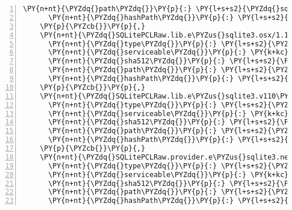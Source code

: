 \begin{Verbatim}[commandchars=\\\{\},numbers=left,firstnumber=1,stepnumber=1,numberblanklines=0]
      \PY{n+nt}{\PYZdq{}path\PYZdq{}}\PY{p}{:} \PY{l+s+s2}{\PYZdq{}sqlitepclraw.lib.e\PYZus{}sqlite3.linux/1.1.10\PYZdq{}}\PY{p}{,}
      \PY{n+nt}{\PYZdq{}hashPath\PYZdq{}}\PY{p}{:} \PY{l+s+s2}{\PYZdq{}sqlitepclraw.lib.e\PYZus{}sqlite3.linux.1.1.10.nupkg.sha512\PYZdq{}}
    \PY{p}{\PYZcb{}}\PY{p}{,}
    \PY{n+nt}{\PYZdq{}SQLitePCLRaw.lib.e\PYZus{}sqlite3.osx/1.1.10\PYZdq{}}\PY{p}{:} \PY{p}{\PYZob{}}
      \PY{n+nt}{\PYZdq{}type\PYZdq{}}\PY{p}{:} \PY{l+s+s2}{\PYZdq{}package\PYZdq{}}\PY{p}{,}
      \PY{n+nt}{\PYZdq{}serviceable\PYZdq{}}\PY{p}{:} \PY{k+kc}{true}\PY{p}{,}
      \PY{n+nt}{\PYZdq{}sha512\PYZdq{}}\PY{p}{:} \PY{l+s+s2}{\PYZdq{}sha512\PYZhy{}9QBqbklaYeBbM6UhGWdXiLxqjgpFWz0aVDJTocUR010Y232rmvLjci2bJRN8wknUPvBd9Uruwdtp+IRn2cV24g==\PYZdq{}}\PY{p}{,}
      \PY{n+nt}{\PYZdq{}path\PYZdq{}}\PY{p}{:} \PY{l+s+s2}{\PYZdq{}sqlitepclraw.lib.e\PYZus{}sqlite3.osx/1.1.10\PYZdq{}}\PY{p}{,}
      \PY{n+nt}{\PYZdq{}hashPath\PYZdq{}}\PY{p}{:} \PY{l+s+s2}{\PYZdq{}sqlitepclraw.lib.e\PYZus{}sqlite3.osx.1.1.10.nupkg.sha512\PYZdq{}}
    \PY{p}{\PYZcb{}}\PY{p}{,}
    \PY{n+nt}{\PYZdq{}SQLitePCLRaw.lib.e\PYZus{}sqlite3.v110\PYZus{}xp/1.1.10\PYZdq{}}\PY{p}{:} \PY{p}{\PYZob{}}
      \PY{n+nt}{\PYZdq{}type\PYZdq{}}\PY{p}{:} \PY{l+s+s2}{\PYZdq{}package\PYZdq{}}\PY{p}{,}
      \PY{n+nt}{\PYZdq{}serviceable\PYZdq{}}\PY{p}{:} \PY{k+kc}{true}\PY{p}{,}
      \PY{n+nt}{\PYZdq{}sha512\PYZdq{}}\PY{p}{:} \PY{l+s+s2}{\PYZdq{}sha512\PYZhy{}VLcwmw7JRASFTSsKuhnLS7tKoS70ZRXtm10yisHl4uYRF+73E2Vbz1gHqLmmJeoPHPr2f1Yd3P8b5uuiSQvJRg==\PYZdq{}}\PY{p}{,}
      \PY{n+nt}{\PYZdq{}path\PYZdq{}}\PY{p}{:} \PY{l+s+s2}{\PYZdq{}sqlitepclraw.lib.e\PYZus{}sqlite3.v110\PYZus{}xp/1.1.10\PYZdq{}}\PY{p}{,}
      \PY{n+nt}{\PYZdq{}hashPath\PYZdq{}}\PY{p}{:} \PY{l+s+s2}{\PYZdq{}sqlitepclraw.lib.e\PYZus{}sqlite3.v110\PYZus{}xp.1.1.10.nupkg.sha512\PYZdq{}}
    \PY{p}{\PYZcb{}}\PY{p}{,}
    \PY{n+nt}{\PYZdq{}SQLitePCLRaw.provider.e\PYZus{}sqlite3.netstandard11/1.1.10\PYZdq{}}\PY{p}{:} \PY{p}{\PYZob{}}
      \PY{n+nt}{\PYZdq{}type\PYZdq{}}\PY{p}{:} \PY{l+s+s2}{\PYZdq{}package\PYZdq{}}\PY{p}{,}
      \PY{n+nt}{\PYZdq{}serviceable\PYZdq{}}\PY{p}{:} \PY{k+kc}{true}\PY{p}{,}
      \PY{n+nt}{\PYZdq{}sha512\PYZdq{}}\PY{p}{:} \PY{l+s+s2}{\PYZdq{}sha512\PYZhy{}vIKJpt9XOVsJEI5PXgBFQmXTPCMAU/iSV6hZVC5+X1JLrmtZFndv8fcLvnBZ6vQwiPA5k+YIJLeYdSvRVJnFQA==\PYZdq{}}\PY{p}{,}
      \PY{n+nt}{\PYZdq{}path\PYZdq{}}\PY{p}{:} \PY{l+s+s2}{\PYZdq{}sqlitepclraw.provider.e\PYZus{}sqlite3.netstandard11/1.1.10\PYZdq{}}\PY{p}{,}
      \PY{n+nt}{\PYZdq{}hashPath\PYZdq{}}\PY{p}{:} \PY{l+s+s2}{\PYZdq{}sqlitepclraw.provider.e\PYZus{}sqlite3.netstandard11.1.1.10.nupkg.sha512\PYZdq{}}

\end{Verbatim}
